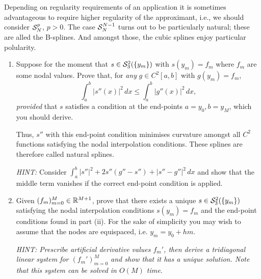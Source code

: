 \begin{exercise}[B-Splines]
    Depending on regularity requirements of an application it is
    sometimes advantageous to require higher regularity of the approximant,
    i.e., we should consider $\mathcal{S}_N^p$, $p > 0$. The case $\mathcal{S}_N^{N-1}$
    turns out to be particularly natural; these are alled the B-splines. And
    amongst those, the cubic splines enjoy particular polularity.

    \begin{enumerate} \ilist 
        \item Suppose for the moment that $s \in \mathcal{S}_3^2(\{y_m\})$ with 
        $s(y_m) = f_m$ where $f_m$ are some nodal values. Prove that, 
        for {\em any} $g \in C^2[a,b]$ with $g(y_m) = f_m$, 
        \[
            \int_{a}^b |s''(x)|^2 \,dx \leq \int_a^b |g''(x)|^2 \,dx,
        \]
        {\em provided} that $s$ satisfies a condition at the end-points 
        $a = y_0, b = y_M$, which you should derive. 

        Thus, $s''$ with this end-point condition minimises curvature amongst
        all $C^2$ functions satisfying the nodal interpolation conditions. 
        These splines are therefore called natural splines. 

        {\it HINT: } Consider $\int_a^b |s''|^2 + 2 s'' (g''-s'') + |s'' - g''|^2 \, dx$
        and show that the middle term vanishes if the correct end-point 
        condition is applied.

        \item Given $(f_m)_{m = 0}^M \in \mathbb{R}^{M+1}$, prove that there exists a
        unique $s \in \mathcal{S}_3^2(\{y_m\})$ satisfying the nodal interpolation
        conditions $s(y_m) = f_m$ and the end-point conditions found in part
        (ii). For the sake of simplicity you may wish to assume that the nodes
        are equispaced, i.e. $y_m = y_0 + h m$.

        {\it HINT: Prescribe artificial derivative values $f_m'$, then derive a
        tridiagonal linear system for $(f_m')_{m=0}^M$ and show that it has a
        unique solution. Note that this system can be solved in $O(M)$ time.}
        \qedhere
    \end{enumerate}
\end{exercise}

